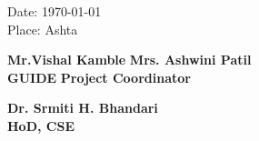 \documentclass[english]{article}
\begin{document}
\vspace{20pt}

\begin{FlushLeft}
Date: \today 
\\
\vspace{20pt}
Place: Ashta
\end{FlushLeft}
\vspace{20pt}
\textbf{Mr.Vishal Kamble} \hspace{13pc} \textbf{Mrs. Ashwini Patil}  \ \ \ \quad 
\\
\textbf{GUIDE}     \hspace{16pc}    \textbf{Project Coordinator}\ \ \ \ \quad 
\\
\vspace{30pt}
\begin{center}
\textbf{Dr. Srmiti H. Bhandari} \ \ \ \quad 
\\
\textbf{HoD, CSE} \ \ \ \quad 

\end{center}


\clearpage %
\end{document}
